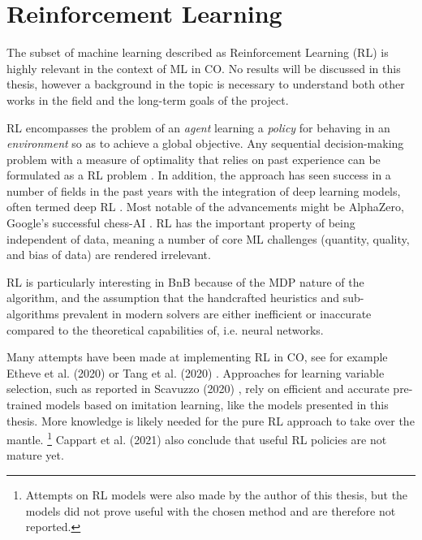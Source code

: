 \section{Reinforcement Learning}

The subset of machine learning described as Reinforcement Learning (\gls{RL}) is highly relevant in the context of \gls{ML} in \gls{CO}. No results will be discussed in this thesis, however a background in the topic is necessary to understand both other works in the field and the long-term goals of the project.

\gls{RL} encompasses the problem of an \textit{agent} learning a \textit{policy} for behaving in an \textit{environment} so as to achieve a global objective. Any sequential decision-making problem with a measure of optimality that relies on past experience can be formulated as a \gls{RL} problem \cite{francois2018introduction}. In addition, the approach has seen success in a number of fields in the past years with the integration of deep learning models, often termed deep \gls{RL} \cite{francois2018introduction}. Most notable of the advancements might be AlphaZero, Google's successful chess-AI \cite{silver2017mastering}. \gls{RL} has the important property of being independent of data, meaning a number of core \gls{ML} challenges (quantity, quality, and bias of data) are rendered irrelevant. 

\gls{RL} is particularly interesting in \gls{BnB} because of the \gls{MDP} nature of the algorithm, and the assumption that the handcrafted heuristics and sub-algorithms prevalent in modern solvers are either inefficient or inaccurate compared to the theoretical capabilities of, i.e. neural networks. 

Many attempts have been made at implementing \gls{RL} in \gls{CO}, see for example Etheve et al. (2020) \cite{etheve2020reinforcement} or Tang et al. (2020) \cite{tang2020reinforcement}. Approaches for learning variable selection, such as reported in Scavuzzo (2020) \cite{scavuzzo2020learning}, rely on efficient and accurate pre-trained models based on imitation learning, like the models presented in this thesis. More knowledge is likely needed for the pure \gls{RL} approach to take over the mantle.
\footnote{Attempts on \gls{RL} models were also made by the author of this thesis, but the models did not prove useful with the chosen method and are therefore not reported.}
Cappart et al. (2021) \cite{cappart2021combinatorial} also conclude that useful \gls{RL} policies are not mature yet. 
